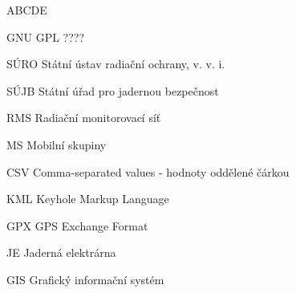 
\begin{seznamzkratek}{ABCDE}

	      {GNU GPL}
	      {????}

	      {SÚRO}
	      {Státní ústav radiační ochrany, v. v. i.}

	      {SÚJB}
	      {Státní úřad pro jadernou bezpečnost}
	      
		  {RMS}
		  {Radiační monitorovací síť}
		  
		  {MS}
		  {Mobilní skupiny}

		  {CSV}
		  {Comma-separated values - hodnoty oddělené čárkou}
		  
		  {KML}
		  {Keyhole Markup Language}
		  
		  {GPX}
		  {GPS Exchange Format}
	
		  {JE}
		  {Jaderná elektrárna}
		  
		  {GIS}
		  {Grafický informační systém}
\end{seznamzkratek}